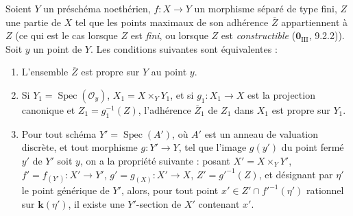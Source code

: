\begin{corollary}[15.7.4]
\label{IV.15.7.4-fr}
Soient $Y$ un préschéma noethérien, $f:X\to Y$ un morphisme séparé de type fini, $Z$ une partie de $X$ tel que les points maximaux de son adhérence $\overline Z$ appartiennent à $Z$ \textup{(ce qui est le cas lorsque $Z$ est \emph{fini}, ou lorsque $Z$ est \emph{constructible} ($\mathbf{0}_{\mathrm{III}}$, 9.2.2))}. Soit $y$ un point de $Y$. Les conditions suivantes sont équivalentes :
\begin{enumerate}
  \item[\rm a)] L'ensemble $\overline Z$ est propre sur $Y$ au point $y$.
  \item[\rm b)] Si $Y_1=\operatorname{Spec}(\mathcal O_y)$, $X_1=X\times_Y Y_1$, et si $g_1:X_1\to X$ est la projection canonique et $Z_1=g_1^{-1}(Z)$, l'adhérence $\overline Z_1$ de $Z_1$ dans $X_1$ est propre sur $Y_1$.
  \item[\rm c)] Pour tout schéma $Y'=\operatorname{Spec}(A')$, où $A'$ est un anneau de valuation discrète, et tout morphisme $g:Y'\to Y$, tel que l'image $g(y')$ du point fermé $y'$ de $Y'$ soit $y$, on a la propriété suivante : posant $X'=X\times_Y Y'$, $f'=f_{(Y')}:X'\to Y'$, $g'=g_{(X)}:X'\to X$, $Z'=g'^{-1}(Z)$, et désignant par $\eta'$
le point générique de $Y'$, alors, pour tout point $x'\in Z'\cap f'^{-1}(\eta')$ rationnel sur $\boldsymbol{k}(\eta')$, il existe une $Y'$-section de $X'$ contenant $x'$.
\end{enumerate}
\end{corollary}

